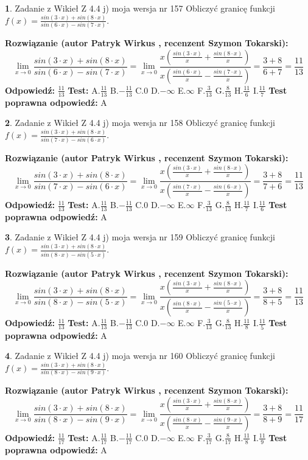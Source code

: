 \documentclass[12pt, a4paper]{article}
\theoremstyle{definition} %
\newtheorem{zad}{}
\newcommand{\zadStart}[1]{\begin{zad}#1\newline}
\newcommand{\zadStop}{\end{zad}}
\newcommand{\rozwStart}[2]{\noindent \textbf{Rozwiązanie (autor #1 , recenzent #2): }\newline}
\newcommand{\rozwStop}{\newline}
\newcommand{\odpStart}{\noindent \textbf{Odpowiedź:}\newline}
\newcommand{\odpStop}{\newline}
\newcommand{\testStart}{\noindent \textbf{Test:}\newline}
\newcommand{\testStop}{\newline}
\newcommand{\kluczStart}{\noindent \textbf{Test poprawna odpowiedź:}\newline}
\newcommand{\kluczStop}{\newline}
\begin{document}
\zadStart{Zadanie z Wikieł Z 4.4 j) moja wersja nr 157}
Obliczyć granicę funkcji $f(x)=\frac{sin(3\cdot x) +sin(8\cdot x)}{sin(6\cdot x) -sin(7\cdot x)}$.
\zadStop
\rozwStart{Patryk Wirkus}{Szymon Tokarski}
$$\lim\limits_{x\to 0}\frac{sin(3\cdot x) +sin(8\cdot x)}{sin(6\cdot x) -sin(7\cdot x)}=\lim\limits_{x\to 0}\frac{x(\frac{sin(3\cdot x)}{x}+\frac{sin(8\cdot x)}{x})}{x(\frac{sin(6\cdot x)}{x}-\frac{sin(7\cdot x)}{x})}=\frac{3+8}{6+7} = \frac{11}{13}$$
\rozwStop
\odpStart
$\frac{11}{13}$
\odpStop
\testStart
A.$\frac{11}{13}$
B.$-\frac{11}{13}$
C.$0$
D.$-\infty$
E.$\infty$
F.$\frac{3}{13}$
G.$\frac{8}{13}$
H.$\frac{11}{6}$
I.$\frac{11}{7}$
\testStop
\kluczStart
A
\kluczStop



\zadStart{Zadanie z Wikieł Z 4.4 j) moja wersja nr 158}
Obliczyć granicę funkcji $f(x)=\frac{sin(3\cdot x) +sin(8\cdot x)}{sin(7\cdot x) -sin(6\cdot x)}$.
\zadStop
\rozwStart{Patryk Wirkus}{Szymon Tokarski}
$$\lim\limits_{x\to 0}\frac{sin(3\cdot x) +sin(8\cdot x)}{sin(7\cdot x) -sin(6\cdot x)}=\lim\limits_{x\to 0}\frac{x(\frac{sin(3\cdot x)}{x}+\frac{sin(8\cdot x)}{x})}{x(\frac{sin(7\cdot x)}{x}-\frac{sin(6\cdot x)}{x})}=\frac{3+8}{7+6} = \frac{11}{13}$$
\rozwStop
\odpStart
$\frac{11}{13}$
\odpStop
\testStart
A.$\frac{11}{13}$
B.$-\frac{11}{13}$
C.$0$
D.$-\infty$
E.$\infty$
F.$\frac{3}{13}$
G.$\frac{8}{13}$
H.$\frac{11}{7}$
I.$\frac{11}{6}$
\testStop
\kluczStart
A
\kluczStop



\zadStart{Zadanie z Wikieł Z 4.4 j) moja wersja nr 159}
Obliczyć granicę funkcji $f(x)=\frac{sin(3\cdot x) +sin(8\cdot x)}{sin(8\cdot x) -sin(5\cdot x)}$.
\zadStop
\rozwStart{Patryk Wirkus}{Szymon Tokarski}
$$\lim\limits_{x\to 0}\frac{sin(3\cdot x) +sin(8\cdot x)}{sin(8\cdot x) -sin(5\cdot x)}=\lim\limits_{x\to 0}\frac{x(\frac{sin(3\cdot x)}{x}+\frac{sin(8\cdot x)}{x})}{x(\frac{sin(8\cdot x)}{x}-\frac{sin(5\cdot x)}{x})}=\frac{3+8}{8+5} = \frac{11}{13}$$
\rozwStop
\odpStart
$\frac{11}{13}$
\odpStop
\testStart
A.$\frac{11}{13}$
B.$-\frac{11}{13}$
C.$0$
D.$-\infty$
E.$\infty$
F.$\frac{3}{13}$
G.$\frac{8}{13}$
H.$\frac{11}{8}$
I.$\frac{11}{5}$
\testStop
\kluczStart
A
\kluczStop



\zadStart{Zadanie z Wikieł Z 4.4 j) moja wersja nr 160}
Obliczyć granicę funkcji $f(x)=\frac{sin(3\cdot x) +sin(8\cdot x)}{sin(8\cdot x) -sin(9\cdot x)}$.
\zadStop
\rozwStart{Patryk Wirkus}{Szymon Tokarski}
$$\lim\limits_{x\to 0}\frac{sin(3\cdot x) +sin(8\cdot x)}{sin(8\cdot x) -sin(9\cdot x)}=\lim\limits_{x\to 0}\frac{x(\frac{sin(3\cdot x)}{x}+\frac{sin(8\cdot x)}{x})}{x(\frac{sin(8\cdot x)}{x}-\frac{sin(9\cdot x)}{x})}=\frac{3+8}{8+9} = \frac{11}{17}$$
\rozwStop
\odpStart
$\frac{11}{17}$
\odpStop
\testStart
A.$\frac{11}{17}$
B.$-\frac{11}{17}$
C.$0$
D.$-\infty$
E.$\infty$
F.$\frac{3}{17}$
G.$\frac{8}{17}$
H.$\frac{11}{8}$
I.$\frac{11}{9}$
\testStop
\kluczStart
A
\kluczStop
\end{document}
